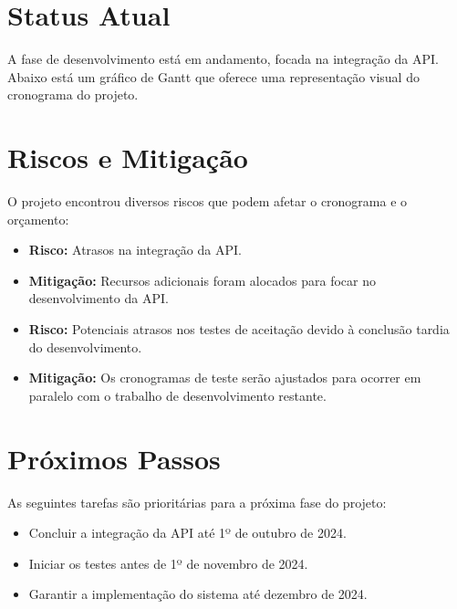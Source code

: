 \documentclass[12pt]{article}
\begin{document}
\section{Status Atual}
A fase de desenvolvimento está em andamento, focada na integração da API. Abaixo está um gráfico de Gantt que oferece uma representação visual do cronograma do projeto.

\begin{center}
\end{center}

\section{Riscos e Mitigação}
O projeto encontrou diversos riscos que podem afetar o cronograma e o orçamento:
\begin{itemize}
    \item \textbf{Risco:} Atrasos na integração da API.
    \item \textbf{Mitigação:} Recursos adicionais foram alocados para focar no desenvolvimento da API.
    \item \textbf{Risco:} Potenciais atrasos nos testes de aceitação devido à conclusão tardia do desenvolvimento.
    \item \textbf{Mitigação:} Os cronogramas de teste serão ajustados para ocorrer em paralelo com o trabalho de desenvolvimento restante.
\end{itemize}

\section{Próximos Passos}
As seguintes tarefas são prioritárias para a próxima fase do projeto:
\begin{itemize}
    \item Concluir a integração da API até 1º de outubro de 2024.
    \item Iniciar os testes antes de 1º de novembro de 2024.
    \item Garantir a implementação do sistema até dezembro de 2024.
\end{itemize}
\end{document}

